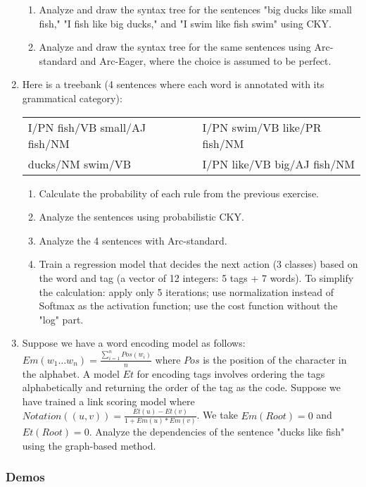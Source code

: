 \documentclass{KodeBook}
\begin{document}
\begin{enumerate}
	\begin{enumerate}
		\item Analyze and draw the syntax tree for the sentences "big ducks like small fish," "I fish like big ducks," and "I swim like fish swim" using CKY.
		\item Analyze and draw the syntax tree for the same sentences using Arc-standard and Arc-Eager, where the choice is assumed to be perfect.
	\end{enumerate}
	
	\item Here is a treebank (4 sentences where each word is annotated with its grammatical category):
	
	\begin{tabular}{|lll|}
		\hline
		I/PN fish/VB small/AJ fish/NM &&
		I/PN swim/VB like/PR fish/NM\\
		ducks/NM swim/VB &&
		I/PN like/VB big/AJ fish/NM \\
		\hline
	\end{tabular}
	
	\begin{enumerate}
		\item Calculate the probability of each rule from the previous exercise.
		\item Analyze the sentences using probabilistic CKY.
		\item Analyze the 4 sentences with Arc-standard.
		\item Train a regression model that decides the next action (3 classes) based on the word and tag (a vector of 12 integers: 5 tags + 7 words). To simplify the calculation: apply only 5 iterations; use normalization instead of Softmax as the activation function; use the cost function without the "log" part.
	\end{enumerate}
	
	\item Suppose we have a word encoding model as follows: $Em(w_1\dots w_n) = \frac{\sum_{i=1}^{n} Pos(w_i)}{n}$ where $Pos$ is the position of the character in the alphabet. A model $Et$ for encoding tags involves ordering the tags alphabetically and returning the order of the tag as the code. Suppose we have trained a link scoring model where $Notation((u, v)) = \frac{Et(u) - Et(v)}{1+ Em(u)*Em(v)}$. We take $Em(Root) = 0$ and $Et(Root) = 0$. Analyze the dependencies of the sentence "ducks like fish" using the graph-based method.
\end{enumerate}


\subsubsection*{Demos}
\end{document}
